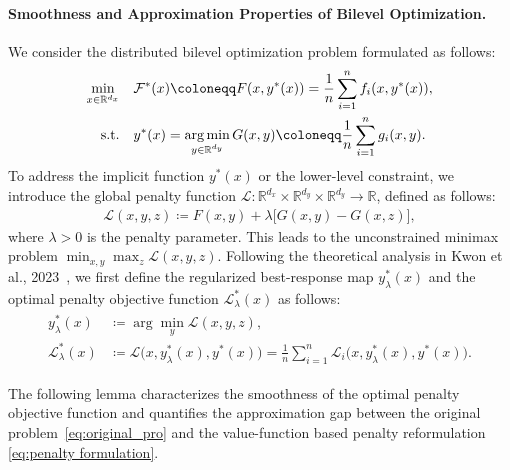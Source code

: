 \documentclass{article}
\theoremstyle{plain}
\theoremstyle{definition}
\theoremstyle{remark}
\begin{document}
\paragraph{Smoothness and Approximation Properties of Bilevel Optimization.}
We consider the distributed bilevel optimization problem formulated as follows: 
\begin{align}\label{eq:bilevel_prob}
    \min_{x \in \mathbb{R}^{d_x}} \quad & \mathcal{F}^{*}(x) \coloneqq F(x, y^*(x)) = \frac{1}{n} \sum_{i=1}^{n} f_{i}(x, y^{*}(x)), \notag \\
    \text{s.t.} \quad & y^{*}(x) = \mathop{\arg\min}_{y \in \mathbb{R}^{d_y}} G(x, y) \coloneqq \frac{1}{n} \sum_{i=1}^{n} g_{i}(x, y).
\end{align}
To address the implicit function $y^{*}(x)$ or the lower-level constraint, we introduce the global penalty function $\mathcal{L}: \mathbb{R}^{d_x} \times \mathbb{R}^{d_y} \times \mathbb{R}^{d_y} \to \mathbb{R}$, defined as follows: 
\begin{align}\label{eq:global_penalty}
    \mathcal{L}(x, y, z) \coloneqq F(x, y) + \lambda \big[ G(x, y) - G(x, z) \big],
\end{align}
where $\lambda>0$ is the penalty parameter. This leads to the unconstrained minimax problem $\min_{x, y} \max_z \mathcal{L}(x, y, z)$. 
Following the theoretical analysis in Kwon et al., 2023~, we first define the regularized best-response map $y_{\lambda}^{*}(x)$ and the optimal penalty objective function $\mathcal{L}_{\lambda}^*(x)$ as follows: 
\begin{align}\label{opt_penalty_function}
\begin{aligned}
    y_{\lambda}^{*}(x) &\coloneqq \arg\min_{y} \mathcal{L}(x, y, z), \\
    \mathcal{L}_{\lambda}^*(x) &\coloneqq 
    \mathcal{L}\big(x, y_\lambda^*(x), y^*(x)\big)
    =\frac{1}{n}\sum_{i=1}^n \mathcal{L}_i\big(x, y_\lambda^*(x), y^*(x)\big).
    \end{aligned}
\end{align}

The following lemma characterizes the smoothness of the optimal penalty objective function and quantifies the approximation gap between the original problem~\eqref{eq:original_pro} and the value-function based penalty reformulation \eqref{eq:penalty formulation}.
\end{document}

